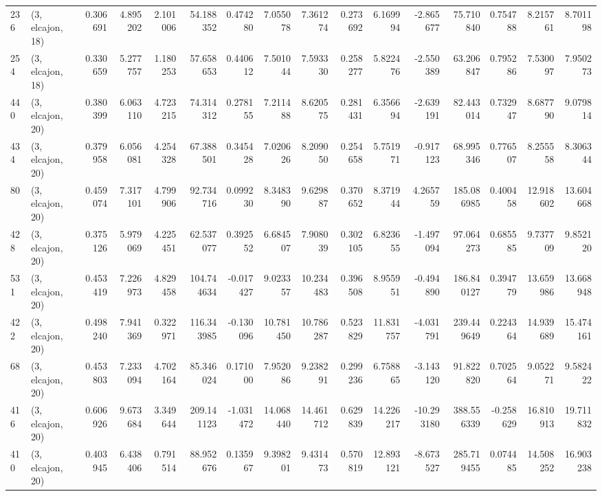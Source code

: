 \begin{tabular}{llrrrrrrrrrrrrrr}
236 &  (3, elcajon, 18) &   0.306691 &   4.895202 &   2.101006 &    54.188352 &   0.474280 &   7.055078 &   7.361274 &  0.273692 &   6.169994 &  -2.865677 &     75.710840 &   0.754788 &   8.215761 &    8.701198 \\
254 &  (3, elcajon, 18) &   0.330659 &   5.277757 &   1.180253 &    57.658653 &   0.440612 &   7.501044 &   7.593330 &  0.258277 &   5.822476 &  -2.550389 &     63.206847 &   0.795286 &   7.530097 &    7.950273 \\
440 &  (3, elcajon, 20) &   0.380399 &   6.063110 &   4.723215 &    74.314312 &   0.278155 &   7.211488 &   8.620575 &  0.281431 &   6.356694 &  -2.639191 &     82.443014 &   0.732947 &   8.687790 &    9.079814 \\
434 &  (3, elcajon, 20) &   0.379958 &   6.056081 &   4.254328 &    67.388501 &   0.345428 &   7.020626 &   8.209050 &  0.254658 &   5.751971 &  -0.917123 &     68.995346 &   0.776507 &   8.255558 &    8.306344 \\
80  &  (3, elcajon, 20) &   0.459074 &   7.317101 &   4.799906 &    92.734716 &   0.099230 &   8.348390 &   9.629887 &  0.370652 &   8.371944 &   4.265759 &    185.086985 &   0.400458 &  12.918602 &   13.604668 \\
428 &  (3, elcajon, 20) &   0.375126 &   5.979069 &   4.225451 &    62.537077 &   0.392552 &   6.684507 &   7.908039 &  0.302105 &   6.823655 &  -1.497094 &     97.064273 &   0.685585 &   9.737709 &    9.852120 \\
531 &  (3, elcajon, 20) &   0.453419 &   7.226973 &   4.829458 &   104.744634 &  -0.017427 &   9.023357 &  10.234483 &  0.396508 &   8.955951 &  -0.494890 &    186.840127 &   0.394779 &  13.659986 &   13.668948 \\
422 &  (3, elcajon, 20) &   0.498240 &   7.941369 &   0.322971 &   116.343985 &  -0.130096 &  10.781450 &  10.786287 &  0.523829 &  11.831757 &  -4.031791 &    239.449649 &   0.224364 &  14.939689 &   15.474161 \\
68  &  (3, elcajon, 20) &   0.453803 &   7.233094 &   4.702164 &    85.346024 &   0.171000 &   7.952086 &   9.238291 &  0.299236 &   6.758865 &  -3.143120 &     91.822820 &   0.702564 &   9.052271 &    9.582422 \\
416 &  (3, elcajon, 20) &   0.606926 &   9.673684 &   3.349644 &   209.141123 &  -1.031472 &  14.068440 &  14.461712 &  0.629839 &  14.226217 & -10.293180 &    388.556339 &  -0.258629 &  16.810913 &   19.711832 \\
410 &  (3, elcajon, 20) &   0.403945 &   6.438406 &   0.791514 &    88.952676 &   0.135967 &   9.398201 &   9.431473 &  0.570819 &  12.893121 &  -8.673527 &    285.719455 &   0.074485 &  14.508252 &   16.903238 \\

\end{tabular}
